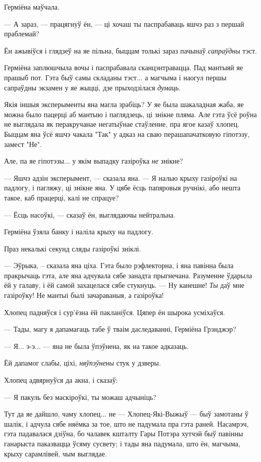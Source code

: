 Герміёна маўчала.

--- А зараз, --- працягнуў ён, --- ці хочаш ты паспрабаваць яшчэ раз з 
першай праблемай?

Ён ажывіўся і глядзеў на яе пільна, быццам толькі зараз пачынаў \emph{сапраўдны}
тэст.

Герміёна заплюшчыла вочы і  паспрабавала сканцэнтравацца. Пад мантыяй яе прашыб пот.
Гэта быў самы складаны тэст... а магчыма і наогул першы сапраўдны 
экзамен у яе жыцці, дзе прыходзілася \emph{думаць}.

Якія іншыя эксперыменты яна магла зрабіць? У яе была шакаладная жаба, 
яе можна было пацерці аб мантыю і паглядзець, ці знікне пляма.
Але гэта ўсё роўна не выглядала як перакручанае негатыўнае стаўленне, пра ягое 
казаў хлопец. Быццам яна ўсё яшчэ чакала "Так" у адказ на сваю перашапачатковую 
гіпотэзу, замест "Не".

Але, па яе гіпотэзы... у якім выпадку газіроўка  \emph{не} знікне?

--- Яшчэ адзін эксперымент, --- сказала яна. --- Я налью крыху газіроўкі на 
падлогу, і пагляжу, ці знікне яна. У цябе ёсць папяровыя ручнікі, або нешта такое,
каб працерці, калі не спрацуе?

--- Ёсць насоўкі, --- сказаў ён, выглядаючы нейтральна.

Герміёна ўзяла банку і наліла крыху на падлогу.

Праз некалькі секунд сляды газіроўкі зніклі.

--- Эўрыка, -- сказала яна ціха. Гэта было рэфлекторна, і яна павінна была пракрычаць
гэта, але яна адчувала сябе занадта прыгнечана. Разуменне ўдарыла ёй у галаву, і ёй
самой захацелася сябе стукнуць. --- Ну канешне! \emph{Ты} даў мне газіроўку! 
Не мантыі былі зачараваныя, а газіроўка!

Хлопец падняўся і сур'ёзна ёй пакланіўся. Цяпер ён шырока усміхаўся. 

--- Тады, магу я дапамагаць табе ў тваім даследаванні, Герміёна Грэнджэр?

--- Я... э-э... --- яна не была ўпэўнена, як на такое адказаць.

Ёй дапамог слабы, ціхі,  \emph{няўпэўнены} стук у дзверы.

Хлопец адвярнуўся да акна, і сказаў: 

--- Я пакуль без маскіроўкі, ты можаш адчыніць?

Тут да яе дайшло, чаму хлопец... не --- Хлопец-Які-Выжыў --- быў замотаны ў шалік, 
і адчула сябе няёмка за тое, што не падумала пра гэта раней. Насамрэч, 
гэта падавалася дзіўна, бо  чалавек кшталту Гары Потэра хутчэй быў павінны
ганарыста паказвацца ўсяму сусвету; і тады яна падумала, што ён, магчыма,
крыху сарамлівей, чым выглядае.

